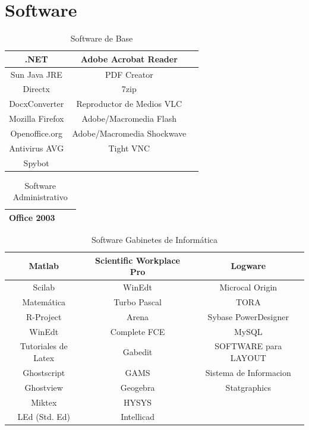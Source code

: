 \documentclass[10pt,a4paper,final]{article}
\begin{document}
\section{Software}

\begin{table}
\caption{Software de Base}
\begin{center}\begin{tabular}{ccc}
\hline .NET & Adobe Acrobat Reader\\
\hline Sun Java JRE & PDF Creator\\
\hline Directx & 7zip\\
\hline DocxConverter & Reproductor de Medios VLC\\
\hline Mozilla Firefox & Adobe/Macromedia Flash\\
\hline Openoffice.org & Adobe/Macromedia Shockwave\\
\hline Antivirus AVG & Tight VNC\\
\hline Spybot & \\
\hline
\end{tabular}\end{center}
\label{tablaerrores}
\end{table}

\begin{table}
\caption{Software Administrativo}
\begin{center}\begin{tabular}{ccc}
\hline Office 2003 \\
\hline
\end{tabular}\end{center}
\end{table}

\begin{table}
\caption{Software Gabinetes de Informática}
\begin{center}\begin{tabular}{ccc}
\hline Matlab & Scientific Workplace Pro & Logware\\
\hline Scilab & WinEdt  & Microcal Origin\\
\hline Matemática & Turbo Pascal & TORA\\
\hline R-Project & Arena  & Sybase PowerDesigner\\
\hline WinEdt & Complete FCE & MySQL\\
\hline Tutoriales de Latex & Gabedit & SOFTWARE para LAYOUT\\
\hline Ghostscript & GAMS & Sistema de Informacion\\
\hline Ghostview & Geogebra & Statgraphics\\
\hline Miktex & HYSYS\\
\hline LEd (Std. Ed) & Intellicad\\
\hline
\end{tabular}\end{center}
\end{table}
\end{document}
